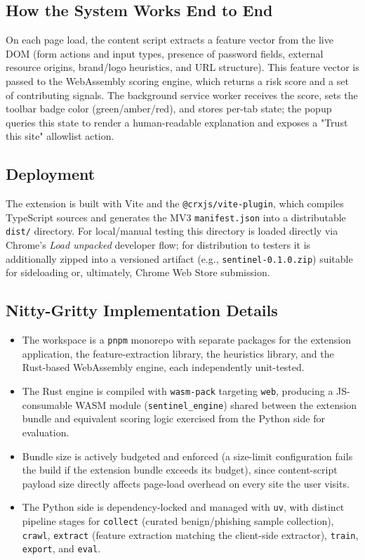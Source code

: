 \documentclass[conference]{IEEEtran}
\begin{document}
\subsection{How the System Works End to End}
On each page load, the content script extracts a feature vector from the live DOM (form actions and input types, presence of password fields, external resource origins, brand/logo heuristics, and URL structure). This feature vector is passed to the WebAssembly scoring engine, which returns a risk score and a set of contributing signals. The background service worker receives the score, sets the toolbar badge color (green/amber/red), and stores per-tab state; the popup queries this state to render a human-readable explanation and exposes a "Trust this site" allowlist action.

\subsection{Deployment}
The extension is built with Vite and the \texttt{@crxjs/vite-plugin}, which compiles TypeScript sources and generates the MV3 \texttt{manifest.json} into a distributable \texttt{dist/} directory. For local/manual testing this directory is loaded directly via Chrome's \emph{Load unpacked} developer flow; for distribution to testers it is additionally zipped into a versioned artifact (e.g., \texttt{sentinel-0.1.0.zip}) suitable for sideloading or, ultimately, Chrome Web Store submission.

\subsection{Nitty-Gritty Implementation Details}
\begin{itemize}
  \item The workspace is a \texttt{pnpm} monorepo with separate packages for the extension application, the feature-extraction library, the heuristics library, and the Rust-based WebAssembly engine, each independently unit-tested.
  \item The Rust engine is compiled with \texttt{wasm-pack} targeting \texttt{web}, producing a JS-consumable WASM module (\texttt{sentinel\_engine}) shared between the extension bundle and equivalent scoring logic exercised from the Python side for evaluation.
  \item Bundle size is actively budgeted and enforced (a size-limit configuration fails the build if the extension bundle exceeds its budget), since content-script payload size directly affects page-load overhead on every site the user visits.
  \item The Python side is dependency-locked and managed with \texttt{uv}, with distinct pipeline stages for \texttt{collect} (curated benign/phishing sample collection), \texttt{crawl}, \texttt{extract} (feature extraction matching the client-side extractor), \texttt{train}, \texttt{export}, and \texttt{eval}.
\end{itemize}
\end{document}

